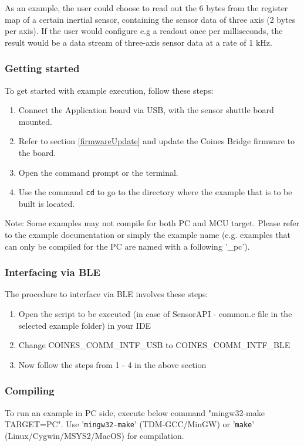 \documentclass{article}
\begin{document}
As an example, the user could choose to read out the 6 bytes from the register map of a certain inertial sensor, containing the sensor data of three axis (2 bytes per axis). If the user would configure e.g a readout once per milliseconds, the result would be a data stream of three-axis sensor data at a rate of 1 kHz.

\subsubsection{Getting started}
To get started with example execution, follow these steps:
\begin{enumerate}
\item Connect the Application board via USB, with the sensor shuttle board mounted.
\item Refer to section \ref{firmwareUpdate} and update the Coines Bridge firmware to the board.
\item Open the command prompt or the terminal.
\item Use the command \texttt{cd} to go to the directory where the example that is to be built is located.
\end{enumerate}
Note: Some examples may not compile for both PC and MCU target. Please refer to the example documentation or simply the example name (e.g. examples that can only be compiled for the PC are named with a following '\_pc').

\subsubsection{Interfacing via BLE}
The procedure to interface via BLE involves these steps:
\begin{enumerate}
	\item Open the script to be executed (in case of SensorAPI - common.c file in the selected example folder) in your IDE
	\item Change COINES\_COMM\_INTF\_USB  to COINES\_COMM\_INTF\_BLE
	\item Now follow the steps from 1 - 4 in the above section
\end{enumerate}

\subsubsection{Compiling}
To run an example in PC side, execute below command "mingw32-make TARGET=PC". Use '\texttt{mingw32-make}' (TDM-GCC/MinGW) or '\texttt{make}' (Linux/Cygwin/MSYS2/MacOS) for compilation.
\end{document}
